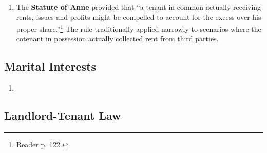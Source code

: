 \begin{enumerate}
\begin{enumerate}
        \begin{enumerate}
            \item The \textbf{Statute of Anne} provided that ``a tenant in 
            common actually receiving rents, issues and profits might be 
            compelled to account for the excess over his proper 
            share.''\footnote{Reader p.  122.} The rule traditionally applied 
            narrowly to scenarios where the cotenant in possession actually 
            collected rent from third parties.  
        \end{enumerate}
    \end{enumerate}
\end{enumerate}

\subsection{Marital Interests}

\begin{enumerate}
    \item 
\end{enumerate}

\subsection{Landlord-Tenant Law}

